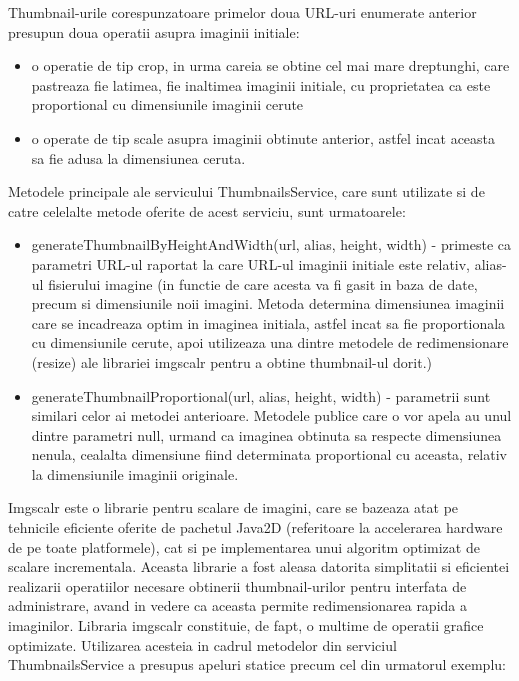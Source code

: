 \bigskip

Thumbnail-urile corespunzatoare primelor doua URL-uri enumerate anterior presupun doua operatii asupra imaginii initiale: 
\begin{itemize}
\item {o operatie de tip crop, in urma careia se obtine cel mai mare dreptunghi, care pastreaza fie latimea, fie inaltimea imaginii initiale, cu proprietatea ca este proportional cu dimensiunile imaginii cerute}
\item{o operate de tip scale asupra imaginii obtinute anterior, astfel incat aceasta sa fie adusa la dimensiunea ceruta.}
\end{itemize}  

Metodele principale ale servicului ThumbnailsService, care sunt utilizate si de catre celelalte metode oferite de acest serviciu, sunt urmatoarele:

\begin{itemize}
\item{generateThumbnailByHeightAndWidth(url, alias, height, width) - primeste ca parametri URL-ul raportat la care URL-ul imaginii initiale este relativ, alias-ul fisierului imagine (in functie de care acesta va fi gasit in baza de date, precum si dimensiunile noii imagini. Metoda determina dimensiunea imaginii care se incadreaza optim in imaginea initiala, astfel incat sa fie proportionala cu dimensiunile cerute, apoi utilizeaza una dintre metodele de redimensionare (resize) ale librariei imgscalr pentru a obtine thumbnail-ul dorit.)}
\item{generateThumbnailProportional(url, alias, height, width) - parametrii sunt similari celor ai metodei anterioare. Metodele publice care o vor apela au unul dintre parametri null, urmand ca imaginea obtinuta sa respecte dimensiunea nenula, cealalta dimensiune fiind determinata proportional cu aceasta, relativ la dimensiunile imaginii originale.}
\end{itemize}

\bigskip

Imgscalr este o librarie pentru scalare de imagini, care se bazeaza atat pe tehnicile eficiente oferite de pachetul Java2D (referitoare la accelerarea hardware de pe toate platformele), cat si pe implementarea unui algoritm optimizat de scalare incrementala. 
Aceasta librarie a fost aleasa datorita simplitatii si eficientei realizarii operatiilor necesare obtinerii thumbnail-urilor pentru interfata de administrare, avand in vedere ca aceasta permite redimensionarea rapida a imaginilor.
Libraria imgscalr constituie, de fapt, o multime  de operatii grafice optimizate. Utilizarea acesteia in cadrul metodelor din serviciul ThumbnailsService a presupus apeluri statice precum cel din urmatorul exemplu:

